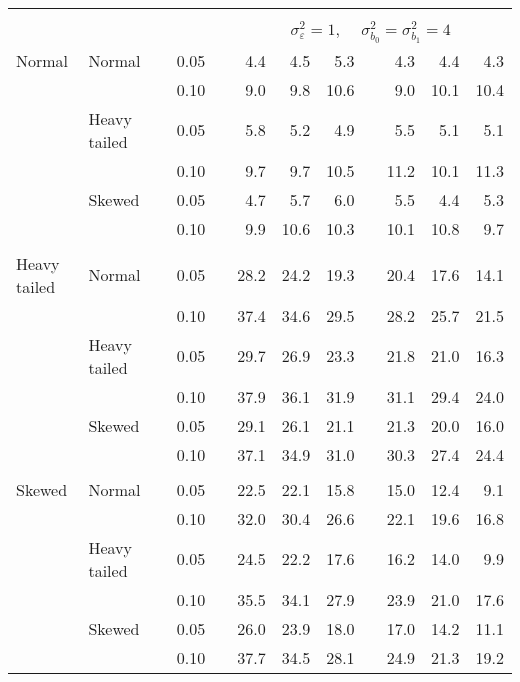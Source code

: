 \begin{table}[ht]
\begin{scriptsize}
\begin{tabular}{ll p{.1cm} c p{.1cm} rrr p{.1cm} rrr}
&&&&&&&&&&&\\
& && && \multicolumn{7}{c}{$\sigma_{\varepsilon}^2 = 1$, \ \ $\sigma_{b_0}^2 = \sigma_{b_1}^2 = 4$} \\ \cline{6-12}
\rowcolor{gray!20} Normal & Normal &  & 0.05 &  & 4.4 & 4.5 & 5.3 &  & 4.3 & 4.4 & 4.3 \\ 
\rowcolor{gray!20}    &  &  & 0.10 &  & 9.0 & 9.8 & 10.6 &  & 9.0 & 10.1 & 10.4 \\ 
\rowcolor{gray!20}    & Heavy tailed &  & 0.05 &  & 5.8 & 5.2 & 4.9 &  & 5.5 & 5.1 & 5.1 \\ 
\rowcolor{gray!20}    &  &  & 0.10 &  & 9.7 & 9.7 & 10.5 &  & 11.2 & 10.1 & 11.3 \\ 
\rowcolor{gray!20}    & Skewed &  & 0.05 &  & 4.7 & 5.7 & 6.0 &  & 5.5 & 4.4 & 5.3 \\ 
\rowcolor{gray!20}    &  &  & 0.10 &  & 9.9 & 10.6 & 10.3 &  & 10.1 & 10.8 & 9.7 \\ 
&&&&&&&&&&&\\
  Heavy tailed & Normal &  & 0.05 &  & 28.2 & 24.2 & 19.3 &  & 20.4 & 17.6 & 14.1 \\ 
   &  &  & 0.10 &  & 37.4 & 34.6 & 29.5 &  & 28.2 & 25.7 & 21.5 \\ 
   & Heavy tailed &  & 0.05 &  & 29.7 & 26.9 & 23.3 &  & 21.8 & 21.0 & 16.3 \\ 
   &  &  & 0.10 &  & 37.9 & 36.1 & 31.9 &  & 31.1 & 29.4 & 24.0 \\ 
   & Skewed &  & 0.05 &  & 29.1 & 26.1 & 21.1 &  & 21.3 & 20.0 & 16.0 \\ 
   &  &  & 0.10 &  & 37.1 & 34.9 & 31.0 &  & 30.3 & 27.4 & 24.4 \\ 
&&&&&&&&&&&\\
  Skewed & Normal &  & 0.05 &  & 22.5 & 22.1 & 15.8 &  & 15.0 & 12.4 & 9.1 \\ 
   &  &  & 0.10 &  & 32.0 & 30.4 & 26.6 &  & 22.1 & 19.6 & 16.8 \\ 
   & Heavy tailed &  & 0.05 &  & 24.5 & 22.2 & 17.6 &  & 16.2 & 14.0 & 9.9 \\ 
   &  &  & 0.10 &  & 35.5 & 34.1 & 27.9 &  & 23.9 & 21.0 & 17.6 \\ 
   & Skewed &  & 0.05 &  & 26.0 & 23.9 & 18.0 &  & 17.0 & 14.2 & 11.1 \\ 
   &  &  & 0.10 &  & 37.7 & 34.5 & 28.1 &  & 24.9 & 21.3 & 19.2 \\ 


\hline
\end{tabular}
\end{scriptsize}
\end{table}


